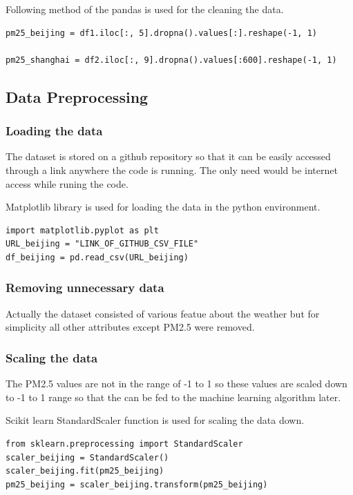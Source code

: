 Following method of the pandas is used for the cleaning the data.

\begin{verbatim}
pm25_beijing = df1.iloc[:, 5].dropna().values[:].reshape(-1, 1)

pm25_shanghai = df2.iloc[:, 9].dropna().values[:600].reshape(-1, 1)
\end{verbatim}

\subsection{Data Preprocessing}

\subsubsection{Loading the data}
The dataset is stored on a github repository so that it can be easily accessed through a link anywhere the code is running. The only need would be internet access while runing the code.

Matplotlib library is used for loading the data in the python environment. 

\begin{verbatim}
import matplotlib.pyplot as plt
URL_beijing = "LINK_OF_GITHUB_CSV_FILE"
df_beijing = pd.read_csv(URL_beijing)
\end{verbatim}

\subsubsection{Removing unnecessary data}
Actually the dataset consisted of various featue about the weather but for simplicity all other attributes except PM2.5 were removed.

\subsubsection{Scaling the data}
The PM2.5 values are not in the range of -1 to 1 so these values are scaled down to -1 to 1 range so that the can be fed to the machine learning algorithm later.

Scikit learn StandardScaler function is used for scaling the data down.

\begin{verbatim}
from sklearn.preprocessing import StandardScaler
scaler_beijing = StandardScaler()
scaler_beijing.fit(pm25_beijing)
pm25_beijing = scaler_beijing.transform(pm25_beijing)
\end{verbatim}

